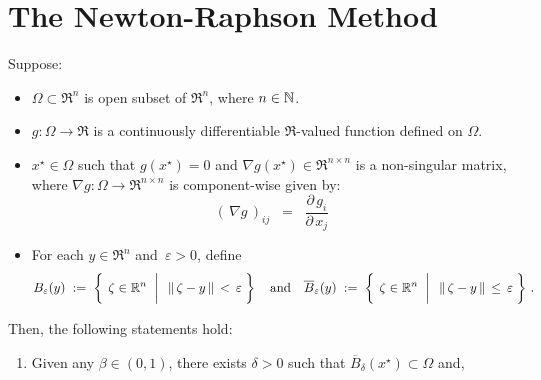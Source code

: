 

\section{The Newton-Raphson Method}
\setcounter{theorem}{0}
\setcounter{equation}{0}

\renewcommand{\theenumi}{\roman{enumi}}
\renewcommand{\labelenumi}{\textnormal{(\theenumi)}$\;\;$}


\begin{theorem}
\label{NewtonRaphson}
\mbox{}\vskip 0.1cm
\noindent
Suppose:
\begin{itemize}
\item
	$\Omega \subset \Re^{n}$ is open subset of $\Re^{n}$, where $n \in \mathbb{N}$.
\item
	$g : \Omega \longrightarrow \Re$ is a continuously differentiable $\Re$-valued function
	defined on $\Omega$.
\item
	$x^{\star} \in \Omega$ such that $g(x^{\star}) = 0$ and
	$\nabla g(x^{\star}) \in \Re^{n \times n}$ is a non-singular matrix,
	where $\nabla g : \Omega \longrightarrow \Re^{n \times n}$ is component-wise given by:
	\begin{equation*}
	(\,\nabla g\,)_{ij}
	\;\; = \;\;
		\dfrac{\partial\,g_{i}}{\partial\,x_{j}}
	\end{equation*}
\item
	For each $y \in \Re^{n}$ and \,$\varepsilon > 0$, define
	\begin{equation*}
	B_{\varepsilon}(y)
	\; := \;
		\left\{\;\left.
		\zeta \overset{{\color{white}+}}{\in} \Re^{n}
		\;\;\right\vert\;\;
		\Vert\,\zeta - y\,\Vert \,<\, \varepsilon
		\;\right\}
	\quad\textnormal{and}\quad
	\overline{B}_{\varepsilon}(y)
	\; := \;
		\left\{\;\left.
		\zeta \overset{{\color{white}+}}{\in} \Re^{n}
		\;\;\right\vert\;\;
		\Vert\,\zeta - y\,\Vert \,\leq\, \varepsilon
		\;\right\}\,.
	\end{equation*}
\end{itemize}
Then, the following statements hold:
\begin{enumerate}
\item\label{NewtonRaphsonGeometricConvergence}
	Given any $\beta \in (0,1)$,
	there exists $\delta > 0$ such that $\overline{B}_{\delta}(x^{\star}) \subset \Omega$ and,

\end{enumerate}
\end{theorem}
